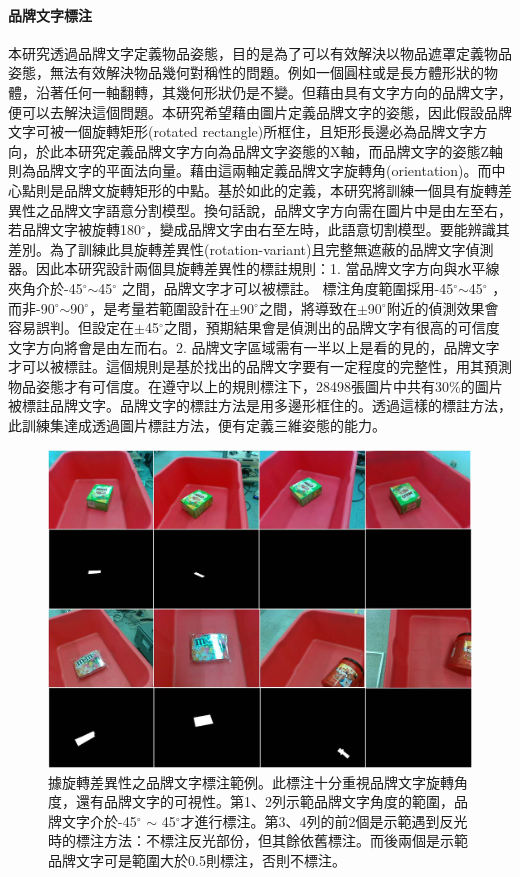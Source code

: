 \paragraph{品牌文字標注}
本研究透過品牌文字定義物品姿態，目的是為了可以有效解決以物品遮罩定義物品姿態，無法有效解決物品幾何對稱性的問題。例如一個圓柱或是長方體形狀的物體，沿著任何一軸翻轉，其幾何形狀仍是不變。但藉由具有文字方向的品牌文字，便可以去解決這個問題。本研究希望藉由圖片定義品牌文字的姿態，因此假設品牌文字可被一個旋轉矩形(rotated rectangle)所框住，且矩形長邊必為品牌文字方向，於此本研究定義品牌文字方向為品牌文字姿態的X軸，而品牌文字的姿態Z軸則為品牌文字的平面法向量。藉由這兩軸定義品牌文字旋轉角(orientation)。而中心點則是品牌文旋轉矩形的中點。基於如此的定義，本研究將訓練一個具有旋轉差異性之品牌文字語意分割模型。換句話說，品牌文字方向需在圖片中是由左至右，若品牌文字被旋轉180$^{\circ}$，變成品牌文字由右至左時，此語意切割模型。要能辨識其差別。為了訓練此具旋轉差異性(rotation-variant)且完整無遮蔽的品牌文字偵測器。因此本研究設計兩個具旋轉差異性的標註規則：1. 當品牌文字方向與水平線夾角介於-45$^{\circ}$$\sim$45$^{\circ}$ 之間，品牌文字才可以被標註。
標注角度範圍採用-45$^{\circ}$$\sim$45$^{\circ}$ ，而非-90$^{\circ}$$\sim$90$^{\circ}$，是考量若範圍設計在$\pm$90$^{\circ}$之間，將導致在$\pm$90$^{\circ}$附近的偵測效果會容易誤判。但設定在$\pm$45$^{\circ}$之間，預期結果會是偵測出的品牌文字有很高的可信度文字方向將會是由左而右。2. 品牌文字區域需有一半以上是看的見的，品牌文字才可以被標註。這個規則是基於找出的品牌文字要有一定程度的完整性，用其預測物品姿態才有可信度。在遵守以上的規則標注下，28498張圖片中共有30\%的圖片被標註品牌文字。品牌文字的標註方法是用多邊形框住的。透過這樣的標註方法，此訓練集達成透過圖片標註方法，便有定義三維姿態的能力。


\begin{figure}[H]
	\centering
	\includegraphics[height=!, width=1.0\linewidth, keepaspectratio=true]
	{./figures/reak_bn_rule.jpg}
  \caption{據旋轉差異性之品牌文字標注範例。此標注十分重視品牌文字旋轉角度，還有品牌文字的可視性。第1、2列示範品牌文字角度的範圍，品牌文字介於-45$^{\circ}$ $\sim$ 45$^{\circ}$才進行標注。第3、4列的前2個是示範遇到反光時的標注方法：不標注反光部份，但其餘依舊標注。而後兩個是示範品牌文字可是範圍大於0.5則標注，否則不標注。}
  \label{figure:reak_bn_rule}
\end{figure}

